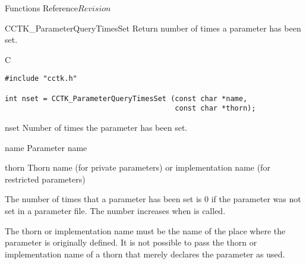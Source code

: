\begin{cactuspart}{ Functions Reference}{}{$Revision$}
\begin{FunctionDescription}{CCTK\_ParameterQueryTimesSet}
\label{CCTK-ParameterQueryTimesSet}
Return number of times a parameter has been set.

\begin{SynopsisSection}
\begin{Synopsis}{C}
\begin{verbatim}
#include "cctk.h"

int nset = CCTK_ParameterQueryTimesSet (const char *name,
                                        const char *thorn);
\end{verbatim}
\end{Synopsis}
\end{SynopsisSection}

\begin{ResultSection}
\begin{Result}{nset}
Number of times the parameter has been set.
\end{Result}
\end{ResultSection}

\begin{ParameterSection}
\begin{Parameter}{name}
Parameter name
\end{Parameter}
\begin{Parameter}{thorn}
Thorn name (for private parameters) or implementation name (for
restricted parameters)
\end{Parameter}
\end{ParameterSection}

\begin{Discussion}
The number of times that a parameter has been set is 0 if the
parameter was not set in a parameter file.  The number increases when
 is called.

The thorn or implementation name must be the name of the place where
the parameter is originally defined.  It is not possible to pass the
thorn or implementation name of a thorn that merely declares the
parameter as used.
\end{Discussion}


\end{FunctionDescription}
\end{cactuspart}
